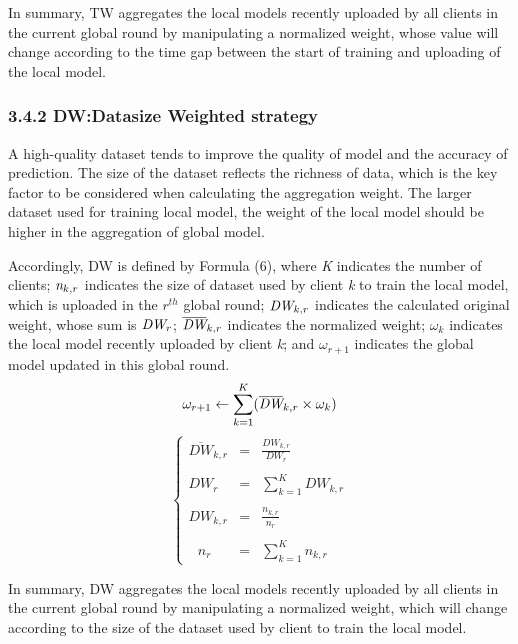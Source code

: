 \documentclass[twoside,twocolumn]{article}
\begin{document}
\begin{spacing}{1.0}
	In summary, TW aggregates the local models recently uploaded by all clients in the current global round by manipulating a normalized weight, whose value will change according to the time gap between the start of training and uploading of the local model.
%
\subsubsection{3.4.2 DW:Datasize Weighted strategy}A high-quality dataset tends to improve the quality of model and the accuracy of prediction. The size of the dataset reflects the richness of data, which is the key factor to be considered when calculating the aggregation weight. The larger dataset used for training local model, the weight of the local model should be higher in the aggregation of global model.

	Accordingly, DW is defined by Formula (6), where \emph{K} indicates the number of clients; $\emph{n}_{k,r}$ indicates the size of dataset used by client \emph{k} to train the local model, which is uploaded in the $r^{th}$ global round; $\emph{DW}_{k,r}$ indicates the calculated original weight, whose sum is $\emph{DW}_{r}$; $\overline{\emph{DW}}_{k,r}$ indicates the normalized weight; $\omega_k$ indicates the local model recently uploaded by client \emph{k}; and $\omega_{r+1}$ indicates the global model updated in this global round.
\begin{equation}
\omega_{r+1} \leftarrow \sum_{k=1}^{K}(\overline{\emph{DW}}_{k,r} \times \omega_k)
\end{equation}
%
\begin{equation}
\left\{
\begin{array}{lll}
\overline{DW}_{k,r} & = & \frac{DW_{k,r}}{DW_{r}}\\
\\
DW_{r} & = & \sum_{k=1}^{K} DW_{k,r}\\
\\
DW_{k,r} & = & \frac{n_{k,r}}{n_{r}}\\
\\
\ \ \ n_{r}&=&\sum_{k=1}^{K}n_{k,r}
\end{array}
\right.
\end{equation}

	In summary, DW aggregates the local models recently uploaded by all clients in the current global round by manipulating a normalized weight, which will change according to the size of the dataset used by client to train the local model.
%

\end{spacing}
\end{document}

